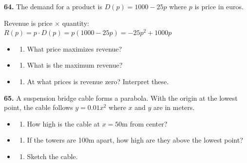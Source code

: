 \documentclass[
  11pt,
]{article}
\providecommand{\tightlist}{%
  \setlength{\itemsep}{0pt}\setlength{\parskip}{0pt}}
\begin{document}
\textbf{64.} The demand for a product is \(D(p) = 1000 - 25p\) where
\(p\) is price in euros.

Revenue is price × quantity:
\(R(p) = p \cdot D(p) = p(1000 - 25p) = -25p^2 + 1000p\)

\begin{itemize}
\item
  \begin{enumerate}
  \def\labelenumi{(\alph{enumi})}
  \tightlist
  \item
    What price maximizes revenue?
  \end{enumerate}
\item
  \begin{enumerate}
  \def\labelenumi{(\alph{enumi})}
  \setcounter{enumi}{1}
  \tightlist
  \item
    What is the maximum revenue?
  \end{enumerate}
\item
  \begin{enumerate}
  \def\labelenumi{(\alph{enumi})}
  \setcounter{enumi}{2}
  \tightlist
  \item
    At what prices is revenue zero? Interpret these.
  \end{enumerate}
\end{itemize}

\textbf{65.} A suspension bridge cable forms a parabola. With the origin
at the lowest point, the cable follows \(y = 0.01x^2\) where \(x\) and
\(y\) are in meters.

\begin{itemize}
\item
  \begin{enumerate}
  \def\labelenumi{(\alph{enumi})}
  \tightlist
  \item
    How high is the cable at \(x = 50\)m from center?
  \end{enumerate}
\item
  \begin{enumerate}
  \def\labelenumi{(\alph{enumi})}
  \setcounter{enumi}{1}
  \tightlist
  \item
    If the towers are 100m apart, how high are they above the lowest
    point?
  \end{enumerate}
\item
  \begin{enumerate}
  \def\labelenumi{(\alph{enumi})}
  \setcounter{enumi}{2}
  \tightlist
  \item
    Sketch the cable.
  \end{enumerate}
\end{itemize}
\end{document}
